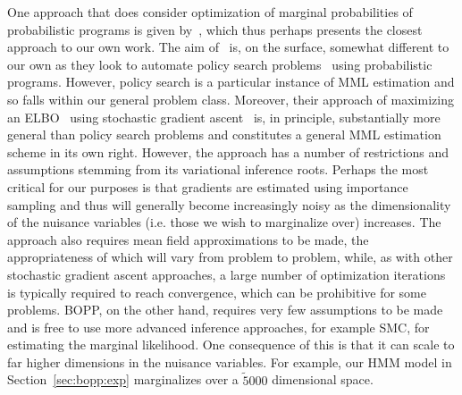 One approach that does consider optimization of marginal probabilities of probabilistic
programs is given by~\cite{vandemeent2016black}, which thus perhaps presents the closest
approach to our own work.  The aim of~\cite{vandemeent2016black} is, on the surface, somewhat
different to our own as they look to automate policy search problems~\citep{deisenroth2013survey}
using probabilistic programs.  However, policy search is a particular instance of MML estimation
and so falls within our general problem class.  Moreover, their approach of maximizing an ELBO~\citep{blei2016variational}
using stochastic gradient ascent~\citep{robbins1951stochastic} is, in principle, substantially
more general than policy search problems and constitutes a general MML estimation scheme in its own right.
However, the approach has a number of restrictions and assumptions stemming from its variational 
inference roots.  Perhaps the most critical for our purposes is that gradients are estimated using
importance sampling and thus will generally become increasingly noisy as the dimensionality of the nuisance variables (i.e. those we wish to marginalize over) increases.
The approach also requires mean field approximations
to be made, the appropriateness of which will vary from problem to problem, while, as with other
stochastic gradient ascent approaches, a large number of optimization iterations is typically required
to reach convergence, which can be prohibitive for some problems.  BOPP, on the other hand, requires
very few assumptions to be made and is free to use more advanced inference approaches, for example
SMC, for estimating the marginal likelihood.  One consequence of this is that it can scale to far
higher dimensions in the nuisance variables.  For example, our HMM model in Section~\ref{sec:bopp:exp}
marginalizes over a $\tilde5000$ dimensional space.

